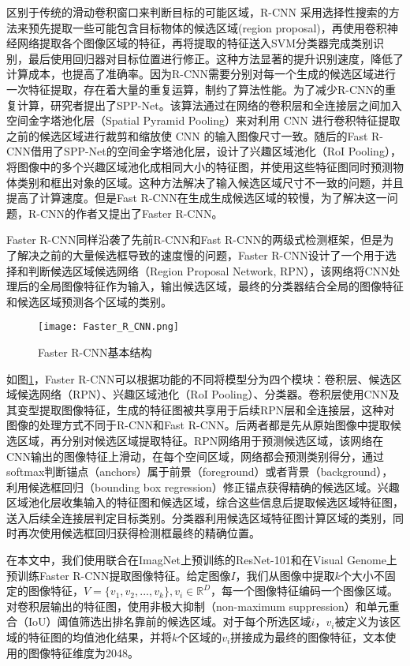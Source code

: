区别于传统的滑动卷积窗口来判断目标的可能区域，R-CNN 采用选择性搜索的方法来预先提取一些可能包含目标物体的候选区域(region proposal)，再使用卷积神经网络提取各个图像区域的特征，再将提取的特征送入SVM分类器完成类别识别，最后使用回归器对目标位置进行修正。这种方法显著的提升识别速度，降低了计算成本，也提高了准确率。因为R-CNN需要分别对每一个生成的候选区域进行一次特征提取，存在着大量的重复运算，制约了算法性能。为了减少R-CNN的重复计算，研究者提出了SPP-Net。该算法通过在网络的卷积层和全连接层之间加入空间金字塔池化层（Spatial Pyramid Pooling）来对利用 CNN 进行卷积特征提取之前的候选区域进行裁剪和缩放使 CNN 的输入图像尺寸一致。随后的Fast R-CNN借用了SPP-Net的空间金字塔池化层，设计了兴趣区域池化（RoI Pooling），将图像中的多个兴趣区域池化成相同大小的特征图，并使用这些特征图同时预测物体类别和框出对象的区域。这种方法解决了输入候选区域尺寸不一致的问题，并且提高了计算速度。但是Fast R-CNN在生成生成候选区域的较慢，为了解决这一问题，R-CNN的作者又提出了Faster R-CNN。

Faster R-CNN同样沿袭了先前R-CNN和Fast R-CNN的两级式检测框架，但是为了解决之前的大量候选框导致的速度慢的问题，Faster R-CNN设计了一个用于选择和判断候选区域候选网络（Region Proposal Network, RPN），该网络将CNN处理后的全局图像特征作为输入，输出候选区域，最终的分类器结合全局的图像特征和候选区域预测各个区域的类别。
\begin{figure}[H]
	\texttt{[image: Faster\_R\_CNN.png]}
	\caption{Faster R-CNN基本结构}
	\label{Faster_R_CNN}
\end{figure}

如图\ref{Faster_R_CNN}，Faster R-CNN可以根据功能的不同将模型分为四个模块：卷积层、候选区域候选网络（RPN）、兴趣区域池化（RoI Pooling）、分类器。卷积层使用CNN及其变型提取图像特征，生成的特征图被共享用于后续RPN层和全连接层，这种对图像的处理方式不同于R-CNN和Fast R-CNN。后两者都是先从原始图像中提取候选区域，再分别对候选区域提取特征。RPN网络用于预测候选区域，该网络在CNN输出的图像特征上滑动，在每个空间区域，网络都会预测类别得分，通过softmax判断锚点（anchors）属于前景（foreground）或者背景（background），利用候选框回归（bounding box regression）修正锚点获得精确的候选区域。兴趣区域池化层收集输入的特征图和候选区域，综合这些信息后提取候选区域特征图，送入后续全连接层判定目标类别。分类器利用候选区域特征图计算区域的类别，同时再次使用候选框回归获得检测框最终的精确位置。

在本文中，我们使用联合在ImagNet上预训练的ResNet-101和在Visual Genome上预训练Faster R-CNN提取图像特征。给定图像$I$，我们从图像中提取$k$个大小不固定的图像特征，$V=\{v_1, v_2, ..., v_k\}, v_i \in \mathbb{R}^D$，每一个图像特征编码一个图像区域。对卷积层输出的特征图，使用非极大抑制（non-maximum suppression）和单元重合（IoU）阈值筛选出排名靠前的候选区域。对于每个所选区域$i$，$v_i$被定义为该区域的特征图的均值池化结果，并将$k$个区域的$v_i$拼接成为最终的图像特征，文本使用的图像特征维度为2048。

